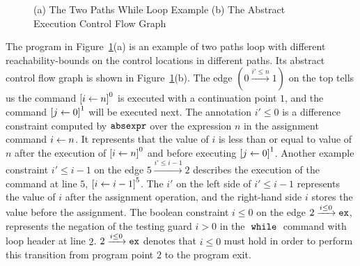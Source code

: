 \begin{example}
{\begin{figure}
\begin{subfigure}{.5\textwidth}
\begin{centering}
\begin{tikzpicture}[scale=\textwidth/20cm,samples=200]
  \end{tikzpicture}
  \caption{}
    \end{centering}
    \end{subfigure}
  \caption{
  (a) The Two Paths While Loop Example
    (b) The Abstract Execution Control Flow Graph}
      \label{fig:twoPathsWhile_abscfg}
  \end{figure}
  }
The program in Figure~\ref{fig:twoPathsWhile_abscfg}(a) is an example of two paths loop with different reachability-bounds on the control
locations in different paths.
Its abstract control flow graph is shown in Figure~\ref{fig:twoPathsWhile_abscfg}(b).
The edge $(0 \xrightarrow{i' \leq n} 1)$ on the top tells us the command 
$\clabel{\assign{i}{n}}^0$ is executed with a continuation point $1$, and the
command $\clabel{\assign{j}{0}}^1$ will be executed next.
The annotation $i' \leq 0$ is a difference constraint 
computed by $\absexpr$ over
the expression $n$ in the assignment command $\assign{i}{n}$.
It represents that the value of $i$ is less than or equal to value of $n$ after the
execution of $\clabel{\assign{i}{n}}^0$ and before executing $\clabel{\assign{j}{0}}^1$.
Another example constraint $i' \leq i - 1$ on the edge $5 \xrightarrow{i' \leq i - 1} 2$
describes the execution of
 the command at line $5$, 
$\clabel{\assign{i}{i - 1}}^{5}$. 
The $i'$ on the left side of $i' \leq i - 1$ represents the value of $i$ after the assignment operation,
and the right-hand side $i$ stores the value before the assignment.
The boolean constraint $i \leq 0 $ on the edge $2 \xrightarrow{i \leq 0} \lex$, 
represents the negation of the testing guard $i > 0$
in the $\ewhile$ command with loop header at line $2$.
$2 \xrightarrow{i \leq 0} \lex$ denotes that $i \leq 0$ must hold in order to perform this transition from program point $2$ to
the program exit. 
\end{example}